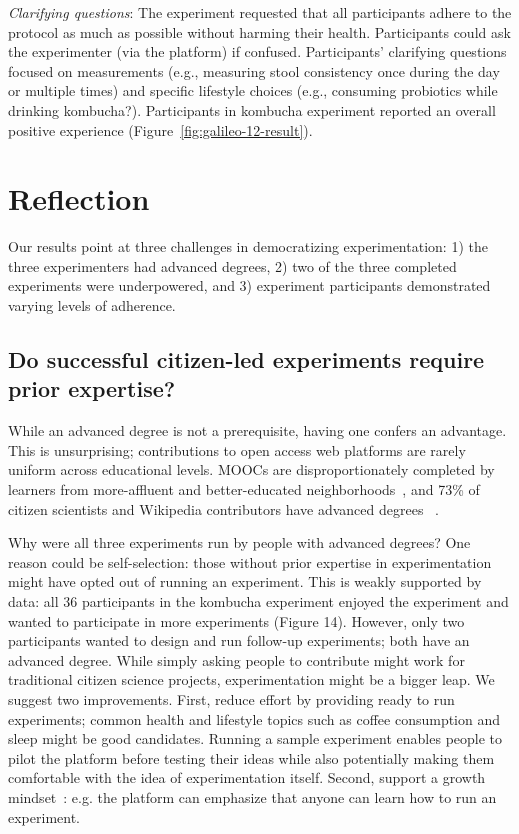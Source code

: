 \textit{Clarifying questions}: The experiment requested that all participants adhere to the protocol as much as possible without harming their health. Participants could ask the experimenter (via the platform) if confused. Participants' clarifying questions focused on measurements (e.g., measuring stool consistency once during the day or multiple times) and specific lifestyle choices (e.g., consuming probiotics while drinking kombucha?). Participants in kombucha experiment reported an overall positive experience (Figure~\ref{fig:galileo-12-result}).

\section{Reflection}
Our results point at three challenges in democratizing experimentation: 1) the three experimenters had advanced degrees, 2) two of the three completed experiments were underpowered, and 3) experiment participants demonstrated varying levels of adherence. 

\subsection{Do successful citizen-led experiments require prior expertise?}
While an advanced degree is not a prerequisite, having one confers an advantage. This is unsurprising; contributions to open access web platforms are rarely uniform across educational levels. MOOCs are disproportionately completed by learners from more-affluent and better-educated neighborhoods~\cite{hansen2015democratizing}, and 73\% of citizen scientists and Wikipedia contributors have advanced degrees~\cite{national2018learning, Wikipedia} . 

Why were all three experiments run by people with advanced degrees? One reason could be self-selection: those without prior expertise in experimentation might have opted out of running an experiment. This is weakly supported by data: all 36 participants in the kombucha experiment enjoyed the experiment and wanted to participate in more experiments (Figure 14). However, only two participants wanted to design and run follow-up experiments; both have an advanced degree. While simply asking people to contribute might work for traditional citizen science projects, experimentation might be a bigger leap. We suggest two improvements. First, reduce effort by providing ready to run experiments; common health and lifestyle topics such as coffee consumption and sleep might be good candidates. Running a sample experiment enables people to pilot the platform before testing their ideas while also potentially making them comfortable with the idea of experimentation itself. Second, support a growth mindset~\cite{dweck2016having}: e.g. the platform can emphasize that anyone can learn how to run an experiment.

